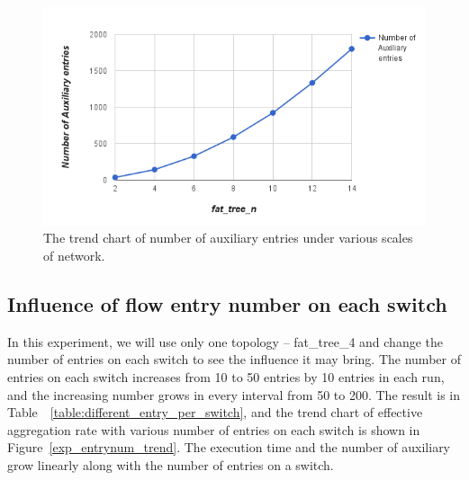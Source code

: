 \begin{figure}[H]
\begin{center} 
\includegraphics[width=1\textwidth]{figures/exp_scale_aux_trend.png}
\end{center}
\caption{The trend chart of number of auxiliary entries under various scales of network.}
\label{different_scale_aux_trend}
\end{figure}

\subsection{Influence of flow entry number on each switch}
In this experiment, we will use only one topology -- fat\_tree\_4 and change the number of entries on each switch to see the influence it may bring. The number of entries on each switch increases from 10 to 50 entries by 10 entries in each run, and the increasing number grows in every interval from 50 to 200. The result is in Table~~\ref{table:different_entry_per_switch}, and the trend chart of effective aggregation rate with various number of entries on each switch is shown in Figure~\ref{exp_entrynum_trend}. The execution time and the number of auxiliary grow linearly along with the number of entries on a switch.

